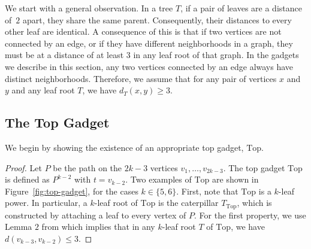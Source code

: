 \documentclass[11pt,letter]{article}
\theoremstyle{remark}
\newcommand{\T}{\text{Top}}
\begin{document}
We start with a general observation. In a tree $T$, if a pair of leaves are a distance of~$2$ apart, they share the same parent. Consequently, their distances to every other leaf are identical. A consequence of this is that if two vertices are not connected by an edge, or if they have different neighborhoods in a graph, they must be at a distance of at least $3$ in any leaf root of that graph. In the gadgets we describe in this section, any two vertices connected by an edge always have distinct neighborhoods. Therefore, we assume that for any pair of vertices $x$ and $y$ and any leaf root $T$, we have $d_T(x, y) \geq 3$.


\subsection{The Top Gadget}\label{sec:top}

We begin by showing the existence of an appropriate top gadget, $\T$.

\top*
\begin{proof}
Let $P$ be the path on the $2k-3$ vertices $v_1, \dots, v_{2k-3}$. The top gadget $\T$ is defined as $P^{k-2}$ with $t = v_{k-2}$.
Two examples of $\T$ are shown in Figure~\ref{fig:top-gadget}, for the cases $k\in \{5,6\}$.
First, note that $\T$ is a $k$-leaf power. In particular, a $k$-leaf root of $\T$ is the caterpillar $T_{\T}$, which is constructed by attaching a leaf to every vertex of $P$. For the first property, we use Lemma $2$ from \cite{WAGNER20095505} which implies that in any $k$-leaf root $T$ of $\T$, we have $d(v_{k-3}, v_{k-2}) \leq 3$.
\end{proof}
\end{document}
